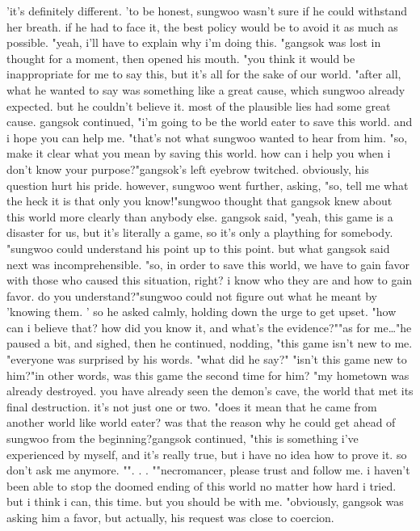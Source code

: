 'it's definitely different.
'to be honest, sungwoo wasn't sure if he could withstand her breath.
 if he had to face it, the best policy would be to avoid it as much as possible.
"yeah, i'll have to explain why i'm doing this.
"gangsok was lost in thought for a moment, then opened his mouth.
"you think it would be inappropriate for me to say this, but it's all for the sake of our world.
"after all, what he wanted to say was something like a great cause, which sungwoo already expected.
 but he couldn't believe it.
 most of the plausible lies had some great cause.
 gangsok continued, "i'm going to be the world eater to save this world.
 and i hope you can help me.
"that's not what sungwoo wanted to hear from him.
"so, make it clear what you mean by saving this world.
 how can i help you when i don't know your purpose?"gangsok's left eyebrow twitched.
 obviously, his question hurt his pride.
however, sungwoo went further, asking, "so, tell me what the heck it is that only you know!"sungwoo thought that gangsok knew about this world more clearly than anybody else.
 gangsok said, "yeah, this game is a disaster for us, but it's literally a game, so it's only a plaything for somebody.
"sungwoo could understand his point up to this point.
 but what gangsok said next was incomprehensible.
 "so, in order to save this world, we have to gain favor with those who caused this situation, right? i know who they are and how to gain favor.
 do you understand?"sungwoo could not figure out what he meant by 'knowing them.
'
so he asked calmly, holding down the urge to get upset.
"how can i believe that? how did you know it, and what's the evidence?""as for me…"he paused a bit, and sighed, then he continued, nodding, "this game isn't new to me.
"everyone was surprised by his words.
"what did he say?" "isn't this game new to him?"in other words, was this game the second time for him? "my hometown was already destroyed.
 you have already seen the demon's cave, the world that met its final destruction.
 it's not just one or two.
"does it mean that he came from another world like world eater? was that the reason why he could get ahead of sungwoo from the beginning?gangsok continued, "this is something i've experienced by myself, and it's really true, but i have no idea how to prove it.
 so don't ask me anymore.
"".
.
.
""necromancer, please trust and follow me.
 i haven't been able to stop the doomed ending of this world no matter how hard i tried.
 but i think i can, this time.
 but you should be with me.
"obviously, gangsok was asking him a favor, but actually, his request was close to coercion.
